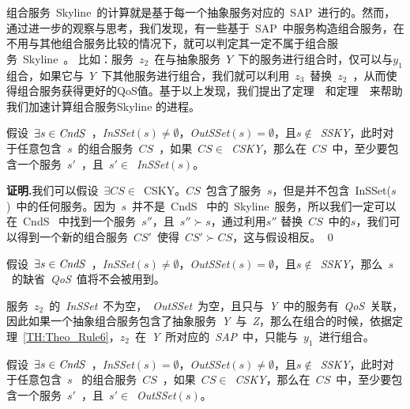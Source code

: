 组合服务~Skyline~的计算就是基于每一个抽象服务对应的~SAP~进行的。然而，通过进一步的观察与思考，我们发现，有一些基于~SAP~中服务构造组合服务，在不用与其他组合服务比较的情况下，就可以判定其一定不属于组合服务~Skyline~。 比如：服务~$z_{2}$~在与抽象服务~$Y$~下的服务进行组合时，仅可以与$y_{1}$组合，如果它与~$Y$~下其他服务进行组合，我们就可以利用~$z_{3}$~替换~$z_{2}$~，从而使得组合服务获得更好的QoS值。基于以上发现，我们提出了定理~~和定理~~来帮助我们加速计算组合服务Skyline 的进程。


\begin{theorem}\label{TH:Theo_Rule6}

假设~$\exists s \in \emph{CndS}$~，\emph{InSSet}$(s) \neq \emptyset$，\emph{OutSSet}$(s) = \emptyset$，且$s \notin$~\emph{SSKY}，此时对于任意包含~$s$~的组合服务~$CS$~，如果~$CS \in$~\emph{CSKY}，那么在~$CS$~中，至少要包含一个服务~$s'$~，且~$s' \in$~\emph{InSSet}$(s)$。

\end{theorem}

\textbf{证明.}我们可以假设~$\exists CS \in$~CSKY。$CS$~包含了服务~$s$，但是并不包含~InSSet($s$)~中的任何服务。因为~$s$~并不是~CndS~ 中的~Skyline~服务，所以我们一定可以在~CndS~ 中找到一个服务~$s''$，且~$s'' \succ s$，通过利用$s''$ 替换~$CS$~中的$s$，我们可以得到一个新的组合服务~$CS'$~使得~$CS' \succ CS$，这与假设相反。
\qed

\begin{lemma}\label{LM:Lemma_Rule6_noDefault}

假设~$\exists s \in \emph{CndS}$~，\emph{InSSet}$(s) \neq \emptyset$，\emph{OutSSet}$(s) = \emptyset$，且$s \notin$~\emph{SSKY}，那么~$s$~的缺省~\emph{QoS}~值将不会被用到。

\end{lemma}



\begin{example}
服务~$z_{2}$~的~\emph{InSSet}~不为空，~\emph{OutSSet}~为空，且只与~\emph{Y}~中的服务有~\emph{QoS}~关联，因此如果一个抽象组合服务包含了抽象服务~\emph{Y}~与~\emph{Z}，那么在组合的时候，依据定理~\ref{TH:Theo_Rule6}，$z_{2}$~在~\emph{Y}~所对应的~\emph{SAP}~中，只能与~$y_{1}$~进行组合。
\end{example}

\begin{theorem}\label{TH:Theo_Rule7}

假设~$\exists s \in \emph{CndS}$~，\emph{InSSet}$(s) = \emptyset$，\emph{OutSSet}$(s) \neq \emptyset$，且$s \notin$~\emph{SSKY}，此时对于任意包含~$s$~ 的组合服务~$CS$~，如果~$CS \in$~\emph{CSKY}，那么在~$CS$~中，至少要包含一个服务~$s'$~，且~$s' \in$~\emph{OutSSet}$(s)$。

\end{theorem}

